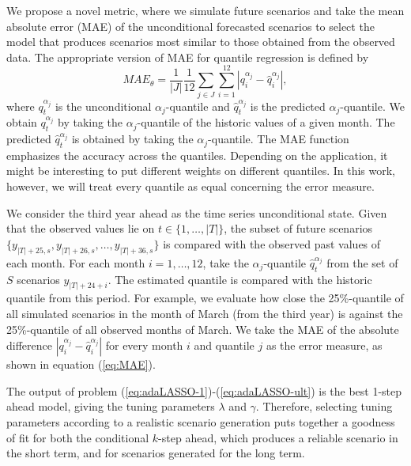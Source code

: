 We propose a novel metric, where we simulate future scenarios and take the mean absolute error (MAE) of the unconditional forecasted scenarios to select the model that produces scenarios most similar to those obtained from the observed data.
The appropriate version of MAE for quantile regression is defined by
\begin{equation}
MAE_{\theta}= \frac{1}{|J|} \frac{1}{12} \sum_{j \in J} \sum_{i = 1}^{12}  \left| q_i^{\alpha_{j}}- \hat q_i^{\alpha_{j}}  \right|,
\label{eq:MAE}
\end{equation}
where $q_t^{\alpha_{j}}$ is the unconditional $\alpha_j$-quantile  and $\hat q_t^{\alpha_j}$ is the predicted $\alpha_j$-quantile. We obtain $q_t^{\alpha_j}$ by taking the $\alpha_j$-quantile of the historic values of a given month. The predicted $\hat q_t^{\alpha_j}$ is obtained by taking the $\alpha_j$-quantile. 
The MAE function emphasizes the accuracy across the quantiles. Depending on the application, it might be interesting to put different weights on different quantiles. In this work, however, we will treat every quantile as equal concerning the error measure.

We consider the third year ahead as the time series unconditional state. Given that the observed values lie on $t \in \{1,\dots,|T| \}$, the subset of future scenarios $\{y_{|T|+25,s}, y_{|T|+26,s}, \dots, y_{|T|+36,s} \}$ is compared with the observed past values of each month. 
For each month $i = 1,\dots, 12$, take the $\alpha_j$-quantile $\hat q_t^{\alpha_j}$ from the set of $S$ scenarios $y_{|T|+24+i}$. The estimated quantile is compared with the historic quantile from this period. For example, we evaluate how close the 25\%-quantile
of all simulated scenarios in the month of March (from the third year) is against the 25\%-quantile
of all observed months of March. We take the MAE of the absolute difference $\left| q_i^{\alpha_{j}}- \hat q_i^{\alpha_{j}}  \right|$ for every month $i$ and quantile $j$ as the error measure, as shown in equation (\ref{eq:MAE}).

The output of problem (\ref{eq:adaLASSO-1})-(\ref{eq:adaLASSO-ult}) is the best 1-step ahead model, giving the tuning parameters $\lambda$ and $\gamma$. 
Therefore, selecting tuning parameters according to a realistic scenario generation puts together a goodness of fit for both the conditional $k$-step ahead, which produces a reliable scenario in the short term, and for scenarios generated for the long term.  








